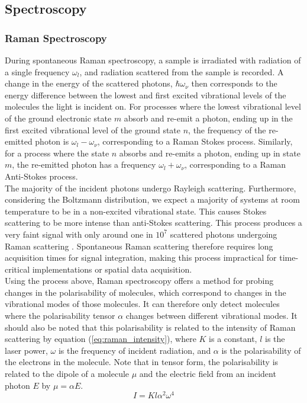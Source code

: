 \subsection{Spectroscopy}

\subsubsection{Raman Spectroscopy}

During spontaneous Raman spectroscopy, a sample is irradiated with radiation of a single frequency $\omega_l$, and radiation scattered from the sample is recorded. A change in the energy of the scattered photons, $\hbar \omega_\nu$ then corresponds to the energy difference between the lowest and first excited vibrational levels of the molecules the light is incident on. For processes where the lowest vibrational level of the ground electronic state $m$ absorb and re-emit a photon, ending up in the first excited vibrational level of the ground state $n$, the frequency of the re-emitted photon is $\omega_l-\omega_\nu$, corresponding to a Raman Stokes process. Similarly, for a process where the state $n$ absorbs and re-emits a photon, ending up in state $m$, the re-emitted photon has a frequency $\omega_l+\omega_\nu$, corresponding to a Raman Anti-Stokes process.\\

The majority of the incident photons undergo Rayleigh scattering. Furthermore, considering the Boltzmann distribution, we expect a majority of systems at room temperature to be in a non-excited vibrational state. This causes Stokes scattering to be more intense than anti-Stokes scattering. This process produces a very faint signal with only around one in $10^7$ scattered photons undergoing Raman scattering \cite{smith_modern_2019}. Spontaneous Raman scattering therefore requires long acquisition times for signal integration, making this process impractical for time-critical implementations or spatial data acquisition.\\

Using the process above, Raman spectroscopy offers a method for probing changes in the polarisability of molecules, which correspond to changes in the vibrational modes of those molecules. It can therefore only detect molecules where the polarisability tensor $\alpha$ changes between different vibrational modes. It should also be noted that this polarisability is related to the intensity of Raman scattering by equation (\ref{eq:raman_intensity}), where $K$ is a constant, $l$ is the laser power, $\omega$ is the frequency of incident radiation, and $\alpha$ is the polarisability of the electrons in the molecule. Note that in tensor form, the polarisability is related to the dipole of a molecule $\mu$ and the electric field from an incident photon $E$ by $\mu=\alpha E$.\\ 
\begin{equation} 
    \label{eq:raman_intensity} 
    I=Kl\alpha^2 \omega^4
\end{equation}

